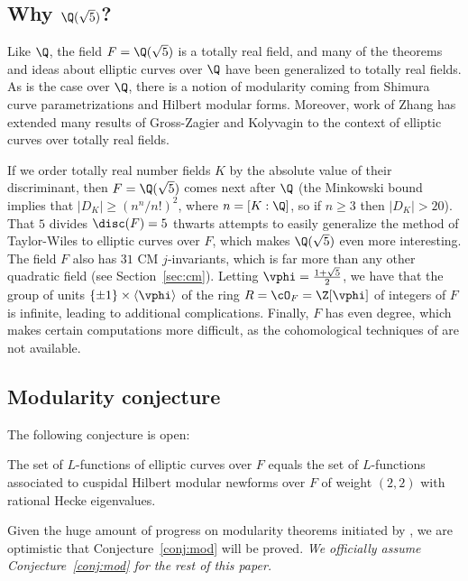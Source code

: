 \documentclass{amsart}
\begin{document}
 
\subsection{Why $\Q(\sqrt{5})$?}

Like $\Q$, the field $F=\Q(\sqrt{5})$ is a totally real field, and
many of the theorems and ideas about elliptic curves over $\Q$ have
been generalized to totally real fields. As is the case over $\Q$,
there is a notion of modularity coming from Shimura curve
parametrizations and Hilbert modular forms.
Moreover, work of Zhang \cite{zhang:heightsshimura}  has extended many
results of Gross-Zagier \cite{gross-zagier} and Kolyvagin
\cite{kolyvagin:mordellweil} to the context of elliptic curves over
totally real fields.

If we order totally real number fields $K$ by the absolute value of
their discriminant, then $F=\Q(\sqrt{5})$ comes next after $\Q$ (the
Minkowski bound implies that $|D_K| \geq (n^n/n!)^2$, where
$n=[K:\Q]$, so if $n\geq 3$ then $|D_K|>20$). That $5$ divides
$\disc(F)=5$ thwarts attempts to easily generalize the
method of Taylor-Wiles to elliptic curves over $F$, which makes
$\Q(\sqrt{5})$ even more interesting.
The field $F$ also has $31$ CM $j$-invariants, which is far more than
 any other quadratic field (see Section~\ref{sec:cm}).  Letting
 $\vphi=\frac{1+\sqrt{5}}{2}$, we have that the group of units
 $\{\pm 1\} \times \langle \vphi \rangle$ of the
ring $R=\cO_F=\Z[\vphi]$ of integers of $F$ is infinite, leading to
additional complications.  Finally, $F$ has even degree, which
makes certain computations more difficult, as the cohomological
techniques of \cite{greenberg-voight:shimura} are not available. 


\subsection{Modularity conjecture}\label{sec:mod}
The following conjecture is open:
\begin{conjecture}[Modularity]\label{conj:mod}
  The set of $L$-functions of elliptic curves over $F$ equals the set
  of $L$-functions associated to cuspidal Hilbert modular newforms
  over $F$ of weight $(2,2)$ with rational Hecke eigenvalues.
\end{conjecture}
Given the huge amount of progress on modularity theorems initiated by
\cite{wiles:fermat}, we are optimistic that Conjecture~\ref{conj:mod}
will be proved.  {\em We officially assume
  Conjecture~\ref{conj:mod} for the rest of this paper.} \\
\end{document}
